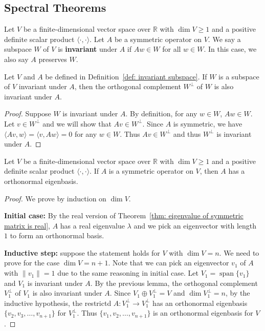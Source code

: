 \documentclass{ctexart}
\newcommand{\R}{\mathbb{R}}
\begin{document}
    \subsection{Spectral Theorems}
    \begin{mydef}\label{def: invariant subspace}
        Let $V$ be a finite-dimensional vector space over $\R$ with $\dim V\ge 1$ and a positive definite scalar product $\langle \cdot, \cdot \rangle$. Let $A$ be a symmetric operator on $V$. We say a subspace $W$ of $V$ is \textbf{invariant} under $A$ if $A w \in W$ for all $w\in W$. In this case, we also say $A$ preserves $W$.
    \end{mydef}
    \begin{mylma}
        Let $V$ and $A$ be defined in Definition~\ref{def: invariant subspace}. If $W$ is a subspace of $V$ invariant under $A$, then the orthogonal complement $W^\perp$ of $W$ is also invariant under $A$.
    \end{mylma}
    \begin{proof}
        Suppose $W$ is invariant under $A$. By definition, for any $w\in W$, $Aw\in W$. Let $v\in W^\perp$ and we will show that $Av \in W^\perp$. Since $A$ is symmetric, we have $\langle Av, w \rangle = \langle v, A w \rangle = 0 $ for any $w\in W$. Thus $Av \in W^\perp$ and thus $W^\perp$ is invariant under $A$.
    \end{proof}
    \begin{mythm}\label{thm: real version of spectral theorem}
        Let $V$ be a finite-dimensional vector space over $\R$ with $\dim V\ge 1$ and a positive definite scalar product $\langle \cdot, \cdot \rangle$. If $A$ is a symmetric operator on $V$, then $A$ has a orthonormal eigenbasis.
    \end{mythm}
    \begin{proof}
        We prove by induction on $\dim V$.

        \textbf{Initial case:} By the real version of Theorem~\ref{thm: eigenvalue of symmetric matrix is real}, $A$ has a real eigenvalue $\lambda$ and we pick an eigenvector with length $1$ to form an orthonormal basis.

        \textbf{Inductive step:} suppose the statement holds for $V$ with $\dim V=n$. We need to prove for the case $\dim V=n+1$. Note that we can pick an eigenvector $v_1$ of $A$ with $\| v_1 \| = 1 $ due to the same reasoning in initial case. Let $V_1 = \operatorname{span} \{ v_1 \}$ and $V_1$ is invariant under $A$. By the previous lemma, the orthogonal complement $V_1^\perp$ of $V_1$ is also invariant under $A$. Since $V_1 \oplus V_1^\perp = V$ and $\dim V_1^\perp = n$, by the inductive hypothesis, the restrictd $A: V_1^\perp \to V_1^\perp$ has an orthonormal eigenbasis $\{v_2, v_3, \ldots, v_{n+1}\}$ for $V_1^\perp$. Thus $\{v_1, v_2, \ldots, v_{n+1}\}$ is an orthonormal eigenbasis for $V$.
    \end{proof}
\end{document}
